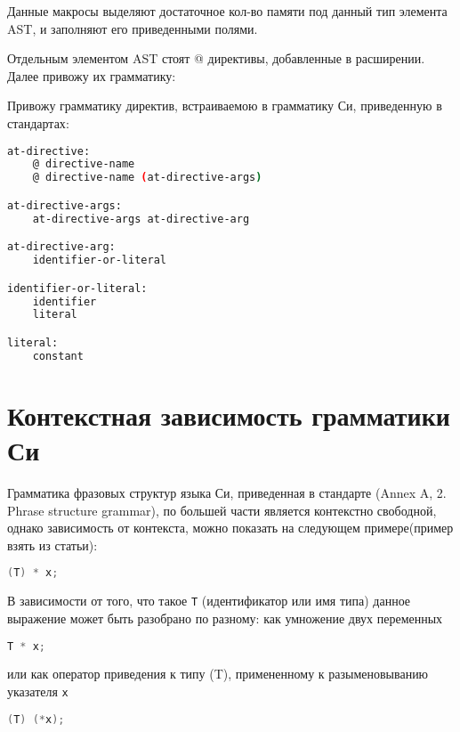 Данные макросы выделяют достаточное кол-во памяти под данный тип элемента AST, и заполняют его приведенными полями.

Отдельным элементом AST стоят @ директивы, добавленные в расширении.
Далее привожу их грамматику:


Привожу грамматику директив, встраиваемою в грамматику Си, приведенную в стандартах\cite{c99_std}:
\begin{lstlisting}[language=bash, caption={Грамматика @ директив}, label={parsing:at-directive:grammar}]
at-directive:
    @ directive-name
    @ directive-name (at-directive-args)

at-directive-args:
    at-directive-args at-directive-arg     

at-directive-arg:
    identifier-or-literal

identifier-or-literal:
    identifier
    literal

literal:
    constant
\end{lstlisting}

\section{Контекстная зависимость грамматики Си}
\label{parsing:context-dep}

Грамматика фразовых структур языка Си, приведенная в стандарте\cite{c99_std} (Annex A, 2. Phrase structure grammar),
по большей части является контекстно свободной, однако зависимость от контекста, можно показать на следующем примере(пример взять из статьи\cite{eli_c_cs}):

\begin{lstlisting}[language=c]
(T) * x;
\end{lstlisting}

В зависимости от того, что такое \verb|T| (идентификатор или имя типа) данное выражение может быть разобрано по разному:
как умножение двух переменных
\begin{lstlisting}[language=c]
T * x;
\end{lstlisting}
или как оператор приведения к типу (T), примененному к разыменовыванию указателя \verb|x|
\begin{lstlisting}[language=c]
(T) (*x);
\end{lstlisting}

